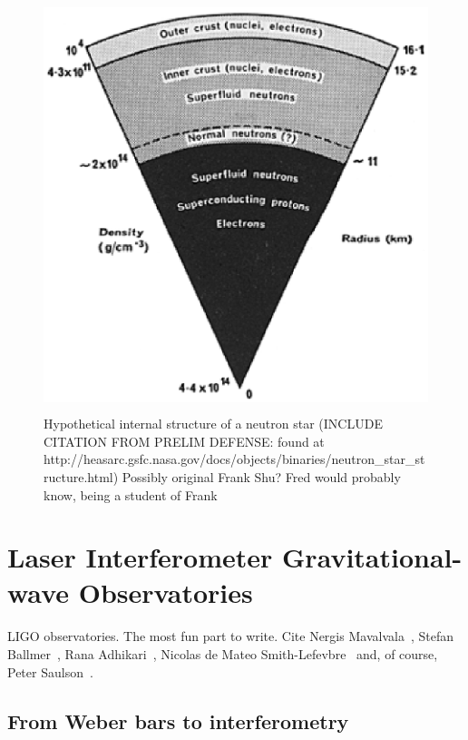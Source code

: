 	\begin{figure}
	\begin{center}
	\includegraphics[height=120mm, width=160mm]{neutron_star_structure.eps}
	\caption{Hypothetical internal structure of a neutron star (INCLUDE CITATION FROM PRELIM DEFENSE: found at http://heasarc.gsfc.nasa.gov/docs/objects/binaries/neutron\_star\_structure.html) Possibly original Frank Shu? Fred would probably know, being a student of Frank}
	\label{neutron_star_structure}
	\end{center}
	\end{figure}


    \section{Laser Interferometer Gravitational-wave Observatories}
    \label{LIGO}
        
        LIGO observatories. The most fun part to write. Cite Nergis Mavalvala~\cite{MavalvalaThesis}, Stefan Ballmer~\cite{BallmerThesis}, Rana Adhikari~\cite{AdhikariThesis}, Nicolas de Mateo Smith-Lefevbre~\cite{SmithThesis} and, of course, Peter Saulson~\cite{Saulson}.

        \subsection{From Weber bars to interferometry}
        \label{bars_to_interferometry}

